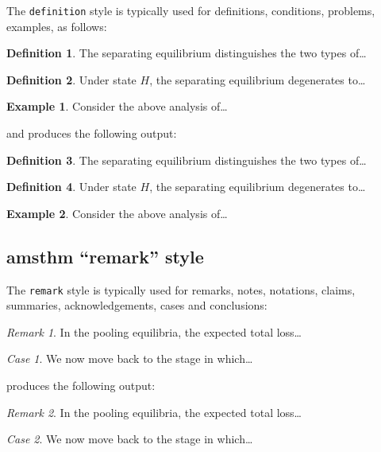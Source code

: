 \documentclass{cje}          %
\theoremstyle{plain}%
\theoremstyle{definition}
\newtheorem{definition}{Definition}
\newtheorem{example}{Example}
\theoremstyle{remark}
\newtheorem*{remark}{Remark}
\newtheorem*{case}{Case}
\begin{document}
The \texttt{definition} style is typically used for definitions, conditions, problems, examples, as follows:
\begin{smallverbatim}
\theoremstyle{definition}
  \newtheorem{definition}{Definition}
  \newtheorem{example}{Example}

\begin{definition}
  The separating equilibrium distinguishes the two types of\ldots
\end{definition}
\begin{definition}
  Under state $H$, the separating equilibrium degenerates to\ldots 
\end{definition}
\begin{example}
  Consider the above analysis of\ldots
\end{example}
\end{smallverbatim}
and produces the following output:
\begin{definition}
  The separating equilibrium distinguishes the two types of\ldots
\end{definition}
\begin{definition}
  Under state $H$, the separating equilibrium degenerates to\ldots
\end{definition}
\begin{example}
  Consider the above analysis of\ldots
\end{example}

\subsection{amsthm ``remark'' style}
The \texttt{remark} style is typically used for remarks, notes, notations, claims, summaries, acknowledgements, cases and conclusions:
\begin{smallverbatim}
\theoremstyle{remark}
  \newtheorem*{remark}{Remark}
  \newtheorem*{case}{Case}

\begin{remark}
  In the pooling equilibria, the expected total loss\ldots
\end{remark}
\begin{case}
  We now move back to the stage in which\ldots
\end{case}
\end{smallverbatim}
produces the following output:
\begin{remark}
  In the pooling equilibria, the expected total loss\ldots
\end{remark}
\begin{case}
  We now move back to the stage in which\ldots
\end{case}
\end{document}
